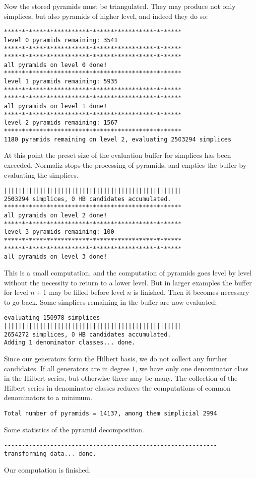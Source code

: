 Now the stored pyramids must be triangulated. They may produce not only simplices, but also pyramids of higher level, and indeed they do so:
\begin{Verbatim}
**************************************************
level 0 pyramids remaining: 3541
**************************************************
**************************************************
all pyramids on level 0 done!
**************************************************
level 1 pyramids remaining: 5935
**************************************************
**************************************************
all pyramids on level 1 done!
**************************************************
level 2 pyramids remaining: 1567
**************************************************
1180 pyramids remaining on level 2, evaluating 2503294 simplices
\end{Verbatim}
At this point the preset size of the evaluation buffer for simplices has been exceeded. Normaliz stops the processing of pyramids, and empties the buffer by evaluating the simplices.
\begin{Verbatim}
||||||||||||||||||||||||||||||||||||||||||||||||||
2503294 simplices, 0 HB candidates accumulated.
**************************************************
all pyramids on level 2 done!
**************************************************
level 3 pyramids remaining: 100
**************************************************
**************************************************
all pyramids on level 3 done!
\end{Verbatim}
This is a small computation, and the computation of pyramids goes level by level without the necessity to return to a lower level. But in larger examples the buffer for level $n+1$ may be filled before level $n$ is finished. Then it becomes necessary to go back. Some simplices remaining in the buffer are now evaluated:
\begin{Verbatim}
evaluating 150978 simplices
||||||||||||||||||||||||||||||||||||||||||||||||||
2654272 simplices, 0 HB candidates accumulated.
Adding 1 denominator classes... done.
\end{Verbatim}
Since our generators form the Hilbert basis, we do not collect any further candidates. If all generators are in degree $1$, we have only one denominator class in the Hilbert series, but otherwise there may be many. The collection of the Hilbert series in denominator classes reduces the computations of common denominators to a minimum.
\begin{Verbatim}
Total number of pyramids = 14137, among them simplicial 2994
\end{Verbatim}
Some statistics of the pyramid decomposition.
\begin{Verbatim}
------------------------------------------------------------
transforming data... done.
\end{Verbatim}
Our computation is finished.

